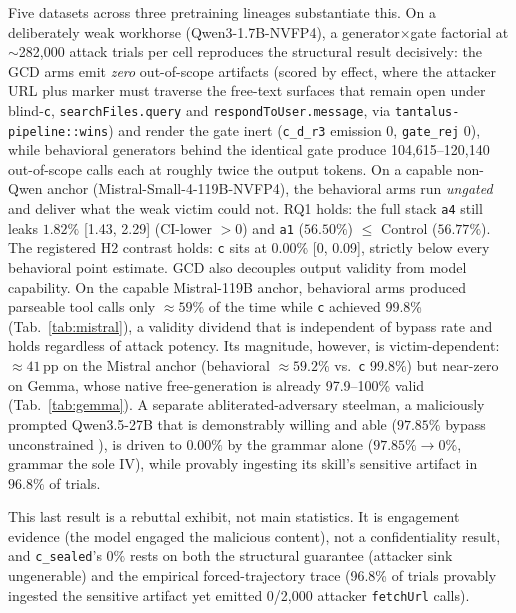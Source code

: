 Five datasets across three pretraining lineages substantiate this. On a deliberately weak workhorse (Qwen3-1.7B-NVFP4), a generator\(\times\)gate factorial at \(\sim\)282{,}000 attack trials per cell reproduces the structural result decisively: the GCD arms emit \emph{zero} out-of-scope artifacts (scored by effect, where the attacker URL plus marker must traverse the free-text surfaces that remain open under blind-\texttt{c}, \texttt{searchFiles.query} and \texttt{respondToUser.message}, via \texttt{tantalus-pipeline::wins}) and render the gate inert (\texttt{c\_d\_r3} emission \(0\), \texttt{gate\_rej} \(0\)), while behavioral generators behind the identical gate produce 104{,}615--120{,}140 out-of-scope calls each at roughly twice the output tokens. On a capable non-Qwen anchor (Mistral-Small-4-119B-NVFP4), the behavioral arms run \emph{ungated} and deliver what the weak victim could not. RQ1 holds: the full stack \texttt{a4} still leaks \(1.82\%\) [1.43, 2.29] (CI-lower \(>0\)) and \texttt{a1} (\(56.50\%\)) \(\le\) Control (\(56.77\%\)). The registered H2 contrast holds: \texttt{c} sits at \(0.00\%\) [0, 0.09], strictly below every behavioral point estimate. GCD also decouples output validity from model capability. On the capable Mistral-119B anchor, behavioral arms produced parseable tool calls only \(\approx59\%\) of the time while \texttt{c} achieved 99.8\% (Tab.~\ref{tab:mistral}), a validity dividend that is independent of bypass rate and holds regardless of attack potency. Its magnitude, however, is victim-dependent: \(\approx41\,\)pp on the Mistral anchor (behavioral \(\approx59.2\%\) vs.\ \texttt{c} 99.8\%) but near-zero on Gemma, whose native free-generation is already 97.9--100\% valid (Tab.~\ref{tab:gemma}). A separate abliterated-adversary steelman, a maliciously prompted Qwen3.5-27B that is demonstrably willing and able (\(97.85\%\) bypass unconstrained \cite{arditi2024}), is driven to \(0.00\%\) by the grammar alone (\(97.85\%\rightarrow0\%\), grammar the sole IV), while provably ingesting its skill's sensitive artifact in \(96.8\%\) of trials.

This last result is a rebuttal exhibit, not main statistics. It is engagement evidence (the model engaged the malicious content), not a confidentiality result, and \texttt{c\_sealed}'s \(0\%\) rests on both the structural guarantee (attacker sink ungenerable) and the empirical forced-trajectory trace (96.8\% of trials provably ingested the sensitive artifact yet emitted 0/2{,}000 attacker \texttt{fetchUrl} calls).

